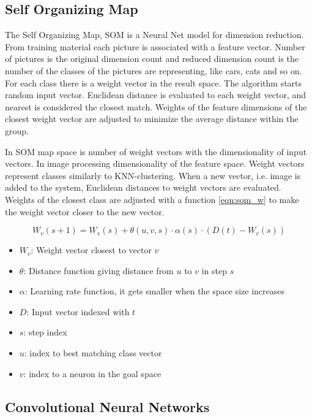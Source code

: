 \documentclass[doc/report.tex]{subfiles}
\begin{document}
\subsection{Self Organizing Map}
The Self Organizing Map, SOM is a Neural Net model for dimension reduction.
From training material each picture is associated with a feature vector. Number
of pictures is the original dimension count and reduced dimension count is the
number of the classes of the pictures are representing, like cars, cats and so
on. For each class there is a weight vector in  the result space. The algorithm
starts random input vector. Euclidean distance is evaluated to each weight
vector, and nearest is considered the closest match. Weights of the feature
dimensions of the closest weight vector are adjusted to minimize the average
distance within the group.

In SOM map space is number of weight vectors with the dimensionality of input
vectors. In image processing dimensionality of the feature space. Weight
vectors represent classes similarly to KNN-clustering. When a new vector, i.e.
image is added to the system, Euclidean distances to weight vectors are
evaluated. Weights of the closest class are adjusted with a function
\eqref{eqn:som_w} to make the weight vector closer to the new vector.

\begin{equation}
    W_v(s+1) = W_v(s) + \theta(u, v, s) \cdot \alpha(s) \cdot (D(t) - W_v(s))
    \label{eqn:som_w}
\end{equation}

\begin{itemize}
    \item $W_v$: Weight vector closest to vector $v$
    \item $\theta$: Distance function giving distance from $u$ to $v$ in step
        $s$
    \item $\alpha$: Learning rate function, it gets smaller when the space size
        increases
    \item $D$: Input vector indexed with $t$
    \item $s$: step index
    \item $u$: index to best matching class vector
    \item $v$: index to a neuron in the goal space
\end{itemize}

\subsection{Convolutional Neural Networks}
\end{document}
